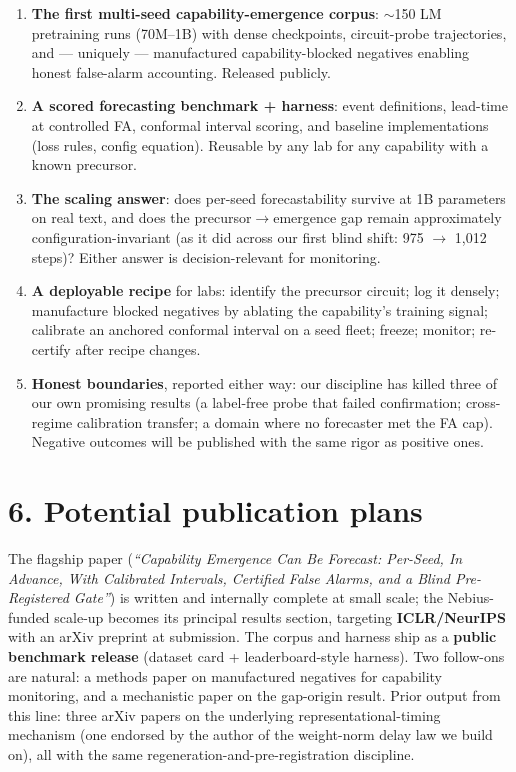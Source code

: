 \documentclass[11pt]{article}
\begin{document}
\begin{enumerate}[label=(\alph*)]
\item \textbf{The first multi-seed capability-emergence corpus}: $\sim$150 LM pretraining
  runs (70M--1B) with dense checkpoints, circuit-probe trajectories, and --- uniquely ---
  manufactured capability-blocked negatives enabling honest false-alarm accounting.
  Released publicly.
\item \textbf{A scored forecasting benchmark + harness}: event definitions, lead-time
  at controlled FA, conformal interval scoring, and baseline implementations (loss rules,
  config equation). Reusable by any lab for any capability with a known precursor.
\item \textbf{The scaling answer}: does per-seed forecastability survive at 1B parameters
  on real text, and does the precursor$\to$emergence gap remain approximately
  configuration-invariant (as it did across our first blind shift: 975 $\to$ 1{,}012
  steps)? Either answer is decision-relevant for monitoring.
\item \textbf{A deployable recipe} for labs: identify the precursor circuit; log it densely;
  manufacture blocked negatives by ablating the capability's training signal; calibrate an
  anchored conformal interval on a seed fleet; freeze; monitor; re-certify after recipe
  changes.
\item \textbf{Honest boundaries}, reported either way: our discipline has killed three of our
  own promising results (a label-free probe that failed confirmation; cross-regime
  calibration transfer; a domain where no forecaster met the FA cap). Negative outcomes will
  be published with the same rigor as positive ones.
\end{enumerate}

\section*{6. Potential publication plans}

The flagship paper (\emph{``Capability Emergence Can Be Forecast: Per-Seed, In Advance,
With Calibrated Intervals, Certified False Alarms, and a Blind Pre-Registered Gate''}) is
written and internally complete at small scale; the Nebius-funded scale-up becomes its
principal results section, targeting \textbf{ICLR/NeurIPS} with an arXiv preprint at
submission. The corpus and harness ship as a \textbf{public benchmark release} (dataset
card + leaderboard-style harness). Two follow-ons are natural: a methods paper on
manufactured negatives for capability monitoring, and a mechanistic paper on the
gap-origin result. Prior output from this line: three arXiv papers on the underlying
representational-timing mechanism (one endorsed by the author of the weight-norm delay
law we build on), all with the same regeneration-and-pre-registration discipline.
\end{document}
